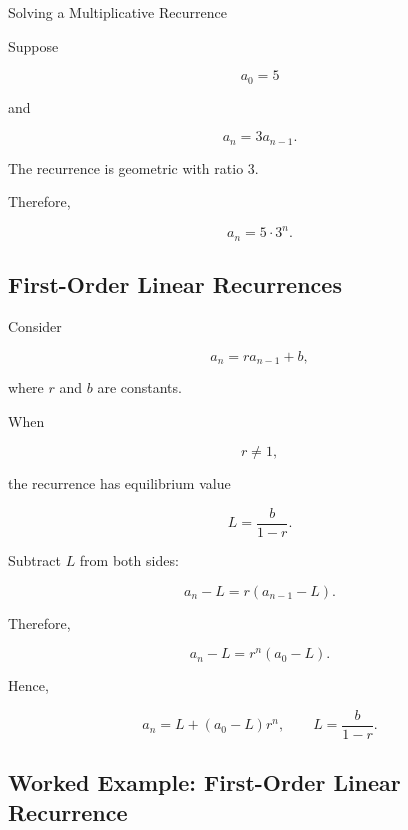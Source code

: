 \begin{workedexamplebox}{Solving a Multiplicative Recurrence}

Suppose

\[
a_0=5
\]

and

\[
a_n=3a_{n-1}.
\]

The recurrence is geometric with ratio \(3\).

Therefore,

\begin{answerbox}
\[
\boxed{
a_n=5\cdot3^n.
}
\]
\end{answerbox}

\end{workedexamplebox}

\subsection{First-Order Linear Recurrences}
\label{subsec:first-order-linear}

Consider

\[
\boxed{
a_n=ra_{n-1}+b,
}
\]

where \(r\) and \(b\) are constants.

When

\[
r\neq1,
\]

the recurrence has equilibrium value

\[
L=\frac{b}{1-r}.
\]

Subtract \(L\) from both sides:

\[
a_n-L
=
r(a_{n-1}-L).
\]

Therefore,

\[
a_n-L
=
r^n(a_0-L).
\]

Hence,

\[
\boxed{
a_n
=
L+(a_0-L)r^n,
\qquad
L=\frac{b}{1-r}.
}
\]

\subsection{Worked Example: First-Order Linear Recurrence}
\label{subsec:worked-first-order-linear}

